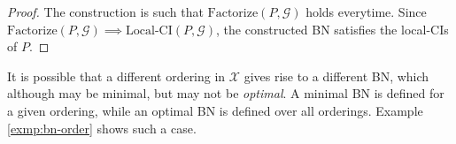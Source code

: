 \begin{proof}
The construction is such that $\text{Factorize}(P, \mathcal G)$ holds everytime. Since $\text{Factorize}(P, \mathcal G) \implies \text{Local-CI}(P, \mathcal G)$, the constructed BN satisfies the local-CIs of $P$.
\end{proof}
\begin{rem}
It is possible that a different ordering in $\mathcal X$ gives rise to a different BN, which although may be minimal, but may not be \textit{optimal}. A minimal BN is defined for a given ordering, while an optimal BN is defined over all orderings. Example \ref{exmp:bn-order} shows such a case.
\end{rem}
